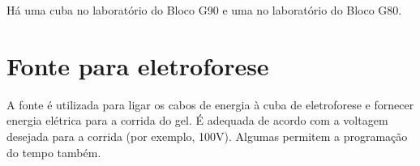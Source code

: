 \documentclass[
  letterpaper,
  DIV=11,
  numbers=noendperiod]{scrreprt}
\begin{document}
Há uma cuba no laboratório do Bloco G90 e uma no laboratório do Bloco
G80.

\hypertarget{fonte-para-eletroforese}{%
\section{Fonte para eletroforese}\label{fonte-para-eletroforese}}

A fonte é utilizada para ligar os cabos de energia à cuba de
eletroforese e fornecer energia elétrica para a corrida do gel. É
adequada de acordo com a voltagem desejada para a corrida (por exemplo,
100V). Algumas permitem a programação do tempo também.

\begin{figure}

\begin{minipage}[t]{0.50\linewidth}

{\centering 


}

\end{minipage}%
%
\begin{minipage}[t]{0.50\linewidth}

{\centering 

}
\end{minipage}
\end{figure}
\end{document}
